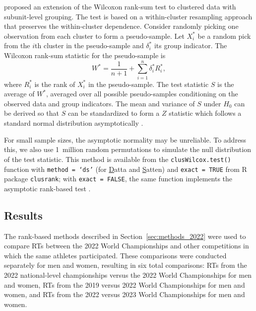 \documentclass[12pt, letterpaper]{article}
\begin{document}
\citet{datta2005rank} proposed an extension of the Wilcoxon rank-sum test to
clustered data with subunit-level grouping. The test is based on a
within-cluster resampling approach that preserves the within-cluster
dependence. Consider randomly picking one observation
from each cluster to form a pseudo-sample. Let $X_i^*$ be a random pick from the
$i$th cluster in the pseudo-sample and $\delta_i^*$ its group indicator. The
Wilcoxon rank-sum statistic for the pseudo-sample is
\[
W^* = \frac{1}{n + 1} + \sum_{i=1}^{n} \delta_{i}^{*} R_{i}^{*},
\]
where $R_{i}^{*}$ is the rank of $X_{i}^{*}$ in the pseudo-sample.
The test statistic $S$ is the average of $W^*$, averaged over all possible
pseudo-samples conditioning on the observed data and group indicators.
The mean and variance of $S$ under $H_0$ can be derived so that $S$ can be
standardized to form a $Z$ statistic which follows a standard normal distribution
asymptotically \citep[p.910]{datta2005rank}.


For small sample sizes, the asymptotic normality may be unreliable. To
address this, we also use 1~million random permutations to
simulate the null distribution of the test statistic.
This method is available from the \texttt{clusWilcox.test()} function
with \texttt{method = `ds'} (for \underline{D}atta and \underline{S}atten) and
\texttt{exact = TRUE} from R package
\texttt{clusrank}; with \texttt{exact = FALSE}, the same function implements the 
asymptotic rank-based test \citep{jiang2020wilcoxon}.


\subsection{Results}
\label{sec:results_2022}


The rank-based methods described in Section~\ref{sec:methods_2022} were used to
compare RTs between the 2022 World Championships and other
competitions in which the same athletes participated. These comparisons
were conducted separately for men and women, resulting in six total
comparisons: RTs from the 2022 national-level championships
versus the 2022 World Championships for men and women, RTs
from the 2019 versus 2022 World Championships for men and women, and
RTs from the 2022 versus 2023 World Championships for men and
women.
\end{document}
